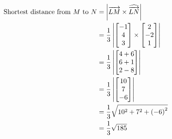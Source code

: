 \documentclass[11pt,a4paper]{book}
\begin{document}
\begin{example}
\begin{align*}
\text{Shortest distance from \ensuremath{M} to \ensuremath{N}} & =\left|\overrightarrow{LM}\times\widehat{\overrightarrow{LN}}\right|\\
 & =\frac{1}{3}\left|\begin{bmatrix}-1\\
4\\
3
\end{bmatrix}\times\begin{bmatrix}2\\
-2\\
1
\end{bmatrix}\right|\\
 & =\frac{1}{3}\left|\begin{bmatrix}4+6\\
6+1\\
2-8
\end{bmatrix}\right|\\
 & =\frac{1}{3}\left|\begin{bmatrix}10\\
7\\
-6
\end{bmatrix}\right|\\
 & =\frac{1}{3}\sqrt{10^{2}+7^{2}+\left(-6\right)^{2}}\\
 & =\frac{1}{3}\sqrt{185}
\end{align*}

\end{example}



\newpage
\end{document}
